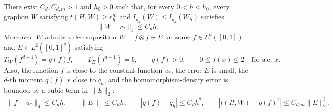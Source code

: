 \begin{lemma}
\label{lem:localization-rank-one}
There exist $C_d,C_{d,m}>1$ and $h_0>0$ such that, for every
$0<h<h_0$, every graphon $W$ satisfying $t(H,W)\ge r_h^m$ and
$I_{p_h}(W)\le I_{p_h}(W_h)$ satisfies
\begin{equation}\label{eq:graphon-quartic-localization}
  \|W-r_*\|_4\le C_dh.
\end{equation}
Moreover, $W$ admits a decomposition $W=f\otimes f+E$ for some
$f\in L^d([0,1])$ and $E\in L^2([0,1]^2)$ satisfying
\begin{equation}\label{eq:rank-one-orthogonality}
  T_W(f^{d-1})=q(f)f,
  \qquad
  T_E(f^{d-1})=0,
  \qquad
  q(f)>0,
  \qquad
  0\le f(x) \le 2
  \quad\text{for a.e. }x.
\end{equation}
Also, the function $f$ is close to the constant function $u_*$, the error
$E$ is small, the $d$-th moment $q(f)$ is close to $q_h$, and the
homomorphism-density error is bounded by a cubic term in $\|E\|_2$:
\begin{equation}\label{eq:rank-one-reduction-bounds}
  \begin{gathered}
  \|f-u_*\|_4\le C_dh,
  \qquad
  \|E\|_2 \le C_dh,
  \qquad
  \left|q(f)-q_h\right|\le C_dh^2,
  \qquad
  |t(H,W)-q(f)^v| \le C_{d,m} \|E\|_2^3.
  \end{gathered}
\end{equation}
\end{lemma}

